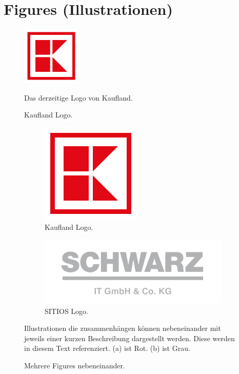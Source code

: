 \chapter{Figures (Illustrationen)}

\begin{figure}[H]
    \centering
    \includegraphics[width=0.25\textwidth]{images/kis}
    \caption{Kaufland Logo.}
    \small Das derzeitige Logo von Kaufland.
    \label{fig-kis-big}
\end{figure}

\vspace{15pt} %

\begin{figure}[H]
    \begin{subfigure}{.45\textwidth}
      \centering
      \includegraphics[width=.325\linewidth]{images/kis}
      \caption{Kaufland Logo.}
      \label{fig-kis}
    \end{subfigure}%
    \hspace{1em} %
    \begin{subfigure}{.45\textwidth}
      \centering
      \includegraphics[width=.9\linewidth]{images/sitios}
      \caption{SITIOS Logo.}
      \label{fig-sitios}
    \end{subfigure}

    \centering
    \caption{Mehrere Figures nebeneinander.}
    \small Illustrationen die zusammenhängen können nebeneinander mit jeweils einer kurzen Beschreibung dargestellt werden. Diese werden in diesem Text referenziert. \newline (a) ist Rot. (b) ist Grau. %
    \label{fig-search}
\end{figure}